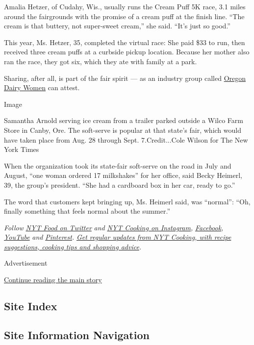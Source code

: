 Amalia Hetzer, of Cudahy, Wis., usually runs the Cream Puff 5K race, 3.1
miles around the fairgrounds with the promise of a cream puff at the
finish line. ``The cream is that buttery, not super-sweet cream,'' she
said. ``It's just so good.''

This year, Ms. Hetzer, 35, completed the virtual race: She paid \$33 to
run, then received three cream puffs at a curbside pickup location.
Because her mother also ran the race, they got six, which they ate with
family at a park.

Sharing, after all, is part of the fair spirit --- as an industry group
called \href{http://oregondairywomen.com/}{Oregon Dairy Women} can
attest.

Image

Samantha Arnold serving ice cream from a trailer parked outside a Wilco
Farm Store in Canby, Ore. The soft-serve is popular at that state's
fair, which would have taken place from Aug. 28 through Sept.
7.Credit...Cole Wilson for The New York Times

When the organization took its state-fair soft-serve on the road in July
and August, ``one woman ordered 17 milkshakes'' for her office, said
Becky Heimerl, 39, the group's president. ``She had a cardboard box in
her car, ready to go.''

The word that customers kept bringing up, Ms. Heimerl said, was
``normal'': ``Oh, finally something that feels normal about the
summer.''

\emph{Follow} \href{https://twitter.com/nytfood}{\emph{NYT Food on
Twitter}} \emph{and}
\href{https://www.instagram.com/nytcooking/}{\emph{NYT Cooking on
Instagram}}\emph{,}
\href{https://www.facebookcorewwwi.onion/nytcooking/}{\emph{Facebook}}\emph{,}
\href{https://www.youtube.com/nytcooking}{\emph{YouTube}} \emph{and}
\href{https://www.pinterest.com/nytcooking/}{\emph{Pinterest}}\emph{.}
\href{https://www.nytimes3xbfgragh.onion/newsletters/cooking}{\emph{Get
regular updates from NYT Cooking, with recipe suggestions, cooking tips
and shopping advice}}\emph{.}

Advertisement

\protect\hyperlink{after-bottom}{Continue reading the main story}

\hypertarget{site-index}{%
\subsection{Site Index}\label{site-index}}

\hypertarget{site-information-navigation}{%
\subsection{Site Information
Navigation}\label{site-information-navigation}}

